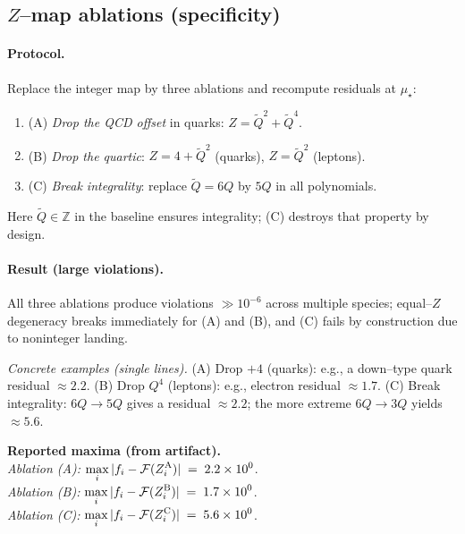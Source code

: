 \documentclass[epjc3]{svjour3}
\begin{document}
\subsection{$Z$–map ablations (specificity)}\label{sec:robust-ablations}

\paragraph{Protocol.} Replace the integer map by three ablations and recompute residuals at $\mu_\star$:
\begin{enumerate}
  \item (A) \emph{Drop the QCD offset} in quarks: $Z\!=\!\tilde Q^2+\tilde Q^4$.
  \item (B) \emph{Drop the quartic}: $Z\!=\!4+\tilde Q^2$ (quarks), $Z\!=\!\tilde Q^2$ (leptons).
  \item (C) \emph{Break integrality}: replace $\tilde Q=6Q$ by $5Q$ in all polynomials.
\end{enumerate}
Here $\tilde Q\!\in\!\mathbb Z$ in the baseline ensures integrality; (C) destroys that property by design.%

\paragraph{Result (large violations).} All three ablations produce violations $\gg 10^{-6}$ across multiple species; equal–$Z$ degeneracy breaks immediately for (A) and (B), and (C) fails by construction due to noninteger landing.

\noindent\emph{Concrete examples (single lines).} (A) Drop $+4$ (quarks): e.g., a down–type quark residual $\approx 2.2$. (B) Drop $Q^4$ (leptons): e.g., electron residual $\approx 1.7$. (C) Break integrality: $6Q\to 5Q$ gives a residual $\approx 2.2$; the more extreme $6Q\to 3Q$ yields $\approx 5.6$.

\medskip
\noindent\textbf{Reported maxima (from artifact).}\\
\emph{Ablation (A):} $\displaystyle \max_i|f_i-\mathcal F(Z_i^{\rm A})| \;=\; 2.2\times10^{0}$. \\
\emph{Ablation (B):} $\displaystyle \max_i|f_i-\mathcal F(Z_i^{\rm B})| \;=\; 1.7\times10^{0}$. \\
\emph{Ablation (C):} $\displaystyle \max_i|f_i-\mathcal F(Z_i^{\rm C})| \;=\; 5.6\times10^{0}$.
\end{document}
